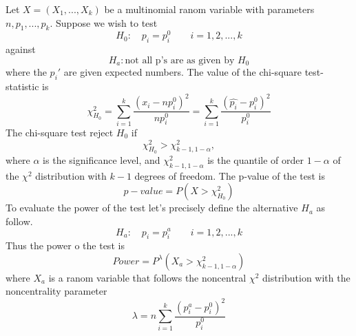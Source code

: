 \documentclass{article}
\begin{document}
Let $X=(X_1, ..., X_k)$ be a multinomial ranom variable with parameters
$n, p_1, ..., p_k$. Suppose we wish to test
\begin{equation}\label{goodness_of_fit_h_0}
    H_0: \quad p_i=p_{i}^0 \qquad i =1,2,...,k
\end{equation}
against
\begin{equation}
    H_a: \mbox{not all p's are as given by } H_0
\end{equation}
where the $p_{i}'$ are given expected numbers. The value of the chi-square test-statistic is
\begin{equation}
    \chi^2_{H_0} = \sum_{i=1}^k \frac{\left(x_i - np_{i}^0\right)^2}{np_{i}^0} = \sum_{i=1}^k \frac{\left(\widehat{p_i}  - p_{i}^0\right)^2}{p_{i}^0}
\end{equation}
The chi-square test reject $H_0$ if
\begin{equation}
    \chi^2_{H_0} > \chi^2_{k-1,1-\alpha},
\end{equation}
where $\alpha$ is the significance level, and $\chi^2_{k-1,1-\alpha}$ is the 
quantile of order $1-\alpha$ of the $\chi^2$ distribution with $k-1$ degrees of
freedom.
The p-value of the test is
\begin{equation}
    p-value = P\left(X>\chi^2_{H_0}\right)
\end{equation}
To evaluate the power of the test let's precisely define the alternative $H_a$ as follow.
\begin{equation}\label{goodness_of_fit_h_a}
    H_a: \quad p_i=p_{i}^a \qquad i =1,2,...,k
\end{equation}
Thus the power o the test is
\begin{equation}
    Power = P^{\lambda}\left(X_a > \chi^2_{k-1,1-\alpha}\right)
\end{equation}
where $X_a$ is a ranom variable that follows the noncentral $\chi^2$ distribution with the noncentrality parameter
\begin{equation}\label{goodness_of_fit_lambda}
    \lambda = n \sum_{i=1}^k \frac{\left(p_{i}^a-p_{i}^0\right)^2}{p_{i}^0}
\end{equation}
\end{document}

